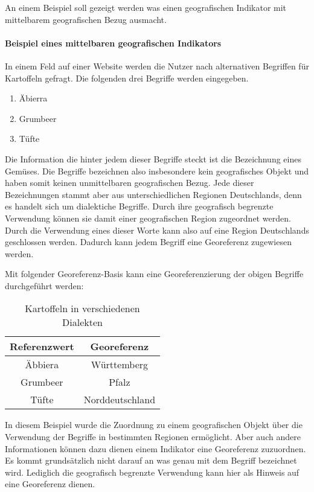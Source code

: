 				An einem Beispiel soll gezeigt werden was einen geografischen Indikator mit mittelbarem geografischen Bezug ausmacht.
				
				\paragraph{Beispiel eines mittelbaren geografischen Indikators} 
				In einem Feld auf einer Website werden die Nutzer nach alternativen Begriffen für Kartoffeln gefragt. 
				Die folgenden drei Begriffe werden eingegeben.

				\begin{enumerate}
				 	\item Äbierra
				 	\item Grumbeer
				 	\item Tüfte 
				 \end{enumerate} 

				Die Information die hinter jedem dieser Begriffe steckt ist die Bezeichnung eines Gemüses.
				Die Begriffe bezeichnen also insbesondere kein geografisches Objekt und haben somit keinen unmittelbaren geografischen Bezug.
				Jede dieser Bezeichnungen stammt aber aus unterschiedlichen Regionen Deutschlands, denn es handelt sich um dialektiche Begriffe.
				Durch ihre geografisch begrenzte Verwendung können sie damit einer geografischen Region zugeordnet werden.
				Durch die Verwendung eines dieser Worte kann also auf eine Region Deutschlands geschlossen werden.
				Dadurch kann jedem Begriff eine Georeferenz zugewiesen werden.

				Mit folgender Georeferenz-Basis kann eine Georeferenzierung der obigen Begriffe durchgeführt werden:

				\begin{table}[htpb]
					\caption{Kartoffeln in verschiedenen Dialekten} 
					\centering
					\begin{tabular}{|c|c|}
						\hline
						Referenzwert & Georeferenz \\
						\hline\hline
						Äbbiera & Württemberg \\
						\hline
						Grumbeer & Pfalz \\
						\hline
						Tüfte & Norddeutschland \\
						\hline
					\end{tabular}
					\label{tab:dialekt} 
				\end{table} 

				In diesem Beispiel wurde die Zuordnung zu einem geografischen Objekt über die Verwendung der Begriffe in bestimmten Regionen ermöglicht.
				Aber auch andere Informationen können dazu dienen einem Indikator eine Georeferenz zuzuordnen.
				Es kommt grundsätzlich nicht darauf an was genau mit dem Begriff bezeichnet wird. 
				Lediglich die geografisch begrenzte Verwendung kann hier als Hinweis auf eine Georeferenz dienen. 

